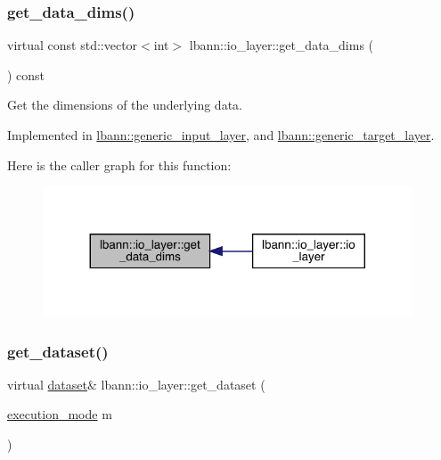 \subsubsection{\texorpdfstring{get\+\_\+data\+\_\+dims()}{get\_data\_dims()}}
{\footnotesize\ttfamily virtual const std\+::vector$<$int$>$ lbann\+::io\+\_\+layer\+::get\+\_\+data\+\_\+dims (\begin{DoxyParamCaption}{ }\end{DoxyParamCaption}) const\hspace{0.3cm}{\ttfamily [pure virtual]}}

Get the dimensions of the underlying data. 

Implemented in \hyperlink{classlbann_1_1generic__input__layer_a6008b13521d27d6139201fa374b088eb}{lbann\+::generic\+\_\+input\+\_\+layer}, and \hyperlink{classlbann_1_1generic__target__layer_abc0a5ec9761f3cebd34d3549d4681108}{lbann\+::generic\+\_\+target\+\_\+layer}.

Here is the caller graph for this function\+:\nopagebreak
\begin{figure}[H]
\begin{center}
\leavevmode
\includegraphics[width=311pt]{classlbann_1_1io__layer_a67feb9fd903ef4d2ca782bbe7860a413_icgraph}
\end{center}
\end{figure}
\mbox{\label{classlbann_1_1io__layer_a027122c10603ede2ab9be779bad135f8}} 
\subsubsection{\texorpdfstring{get\+\_\+dataset()}{get\_dataset()}\hspace{0.1cm}{\footnotesize\ttfamily [1/2]}}
{\footnotesize\ttfamily virtual \hyperlink{classlbann_1_1dataset}{dataset}\& lbann\+::io\+\_\+layer\+::get\+\_\+dataset (\begin{DoxyParamCaption}\item[{\hyperlink{base_8hpp_a2781a159088df64ed7d47cc91c4dc0a8}{execution\+\_\+mode}}]{m }\end{DoxyParamCaption})\hspace{0.3cm}{\ttfamily [pure virtual]}}

